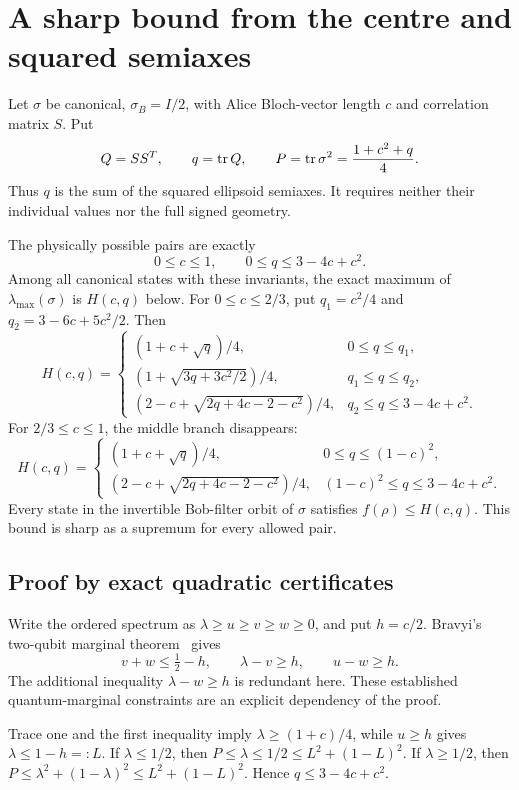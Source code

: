 \section{A sharp bound from the centre and squared semiaxes}\label{sec:purity-envelope}
Let $\sigma$ be canonical, $\sigma_B=I/2$, with Alice Bloch-vector length $c$ and correlation matrix $S$. Put
\[
 Q=SS^T,\qquad q=\operatorname{tr} Q,\qquad P=\operatorname{tr}\sigma^2=\frac{1+c^2+q}{4}.
\]
Thus $q$ is the sum of the squared ellipsoid semiaxes. It requires neither their individual values nor the full signed geometry.

\begin{theorem}\label{thm:purity-envelope}
The physically possible pairs are exactly
\[
 0\le c\le1,\qquad 0\le q\le3-4c+c^2.
\]
Among all canonical states with these invariants, the exact maximum of $\lambda_{\max}(\sigma)$ is $H(c,q)$ below.
For $0\le c\le2/3$, put $q_1=c^2/4$ and $q_2=3-6c+5c^2/2$. Then
\[
 \boxed{H(c,q)=
 \begin{cases}
 (1+c+\sqrt q)/4,&0\le q\le q_1,\\
 (1+\sqrt{3q+3c^2/2})/4,&q_1\le q\le q_2,\\
 (2-c+\sqrt{2q+4c-2-c^2})/4,&q_2\le q\le3-4c+c^2.
 \end{cases}}
\]
For $2/3\le c\le1$, the middle branch disappears:
\[
 \boxed{H(c,q)=
 \begin{cases}
 (1+c+\sqrt q)/4,&0\le q\le(1-c)^2,\\
 (2-c+\sqrt{2q+4c-2-c^2})/4,&(1-c)^2\le q\le3-4c+c^2.
 \end{cases}}
\]
Every state in the invertible Bob-filter orbit of $\sigma$ satisfies $f(\rho)\le H(c,q)$. This bound is sharp as a supremum for every allowed pair.
\end{theorem}

\subsection{Proof by exact quadratic certificates}
Write the ordered spectrum as $\lambda\ge u\ge v\ge w\ge0$, and put $h=c/2$. Bravyi's two-qubit marginal theorem~\cite{bravyi} gives
\begin{equation}\label{eq:bravyi-used}
 v+w\le\tfrac12-h,\qquad \lambda-v\ge h,\qquad u-w\ge h.
\end{equation}
The additional inequality $\lambda-w\ge h$ is redundant here. These established quantum-marginal constraints are an explicit dependency of the proof.

Trace one and the first inequality imply $\lambda\ge(1+c)/4$, while $u\ge h$ gives $\lambda\le1-h=:L$.
If $\lambda\le1/2$, then $P\le\lambda\le1/2\le L^2+(1-L)^2$.
If $\lambda\ge1/2$, then
$P\le\lambda^2+(1-\lambda)^2\le L^2+(1-L)^2$.
Hence $q\le3-4c+c^2$.

